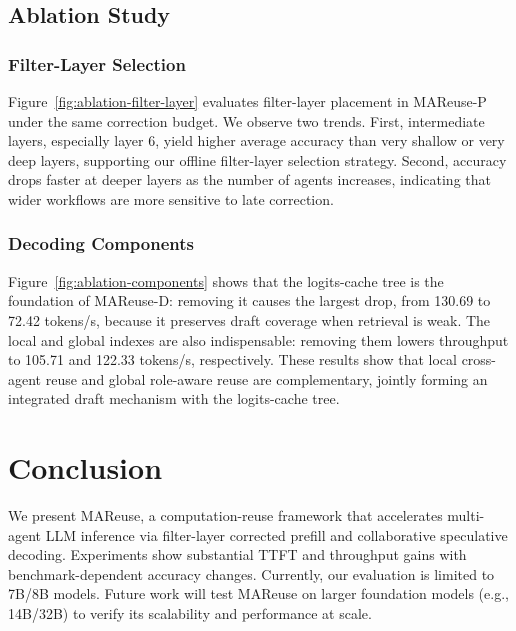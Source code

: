 \documentclass[letterpaper]{article} %
\begin{document}
\subsection{Ablation Study}

\subsubsection{Filter-Layer Selection}



Figure~\ref{fig:ablation-filter-layer} evaluates filter-layer placement in MAReuse-P under the same correction budget. We observe two trends. First, intermediate layers, especially layer 6, yield higher average accuracy than very shallow or very deep layers, supporting our offline filter-layer selection strategy. Second, accuracy drops faster at deeper layers as the number of agents increases, indicating that wider workflows are more sensitive to late correction.

\subsubsection{Decoding Components}
Figure~\ref{fig:ablation-components} shows that the logits-cache tree is the foundation of MAReuse-D: removing it causes the largest drop, from 130.69 to 72.42 tokens/s, because it preserves draft coverage when retrieval is weak. The local and global indexes are also indispensable: removing them lowers throughput to 105.71 and 122.33 tokens/s, respectively. These results show that local cross-agent reuse and global role-aware reuse are complementary, jointly forming an integrated draft mechanism with the logits-cache tree.




\section{Conclusion}
We present MAReuse, a computation-reuse framework that accelerates multi-agent LLM inference via filter-layer corrected prefill and collaborative speculative decoding. Experiments show substantial TTFT and throughput gains with benchmark-dependent accuracy changes. 
Currently, our evaluation is limited to 7B/8B models. Future work will test MAReuse on larger foundation models (e.g., 14B/32B) to verify its scalability and performance at scale. 


\end{document}

